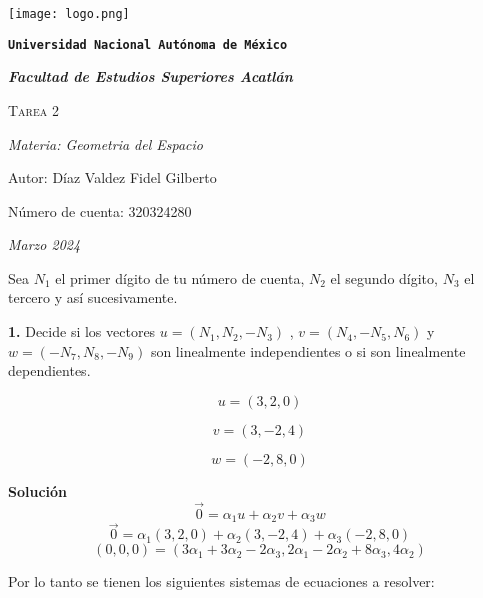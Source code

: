\documentclass{article}
\begin{document}
\begin{titlepage}
   \centering
   {\texttt{[image: logo.png]}\par}
   {\texttt{\bfseries \LARGE Universidad Nacional Autónoma de México} \par}
   \vspace{1cm}
   {\itshape \Large \bfseries Facultad de Estudios Superiores Acatlán \par}
   \vspace{3cm}
   {\scshape \Huge Tarea 2 \par}
   \vspace {3cm}
   {\slshape \Large Materia: Geometria del Espacio \par}
   \vspace{2cm}
   {\Large Autor: Díaz Valdez Fidel Gilberto\par}
   {\Large Número de cuenta: 320324280\par}
   \vfill
   {\itshape Marzo 2024 \par}
\end{titlepage}


Sea $N_1$ el primer dígito de tu número de cuenta, $N_2$ el segundo dígito, $N_3$ el tercero y así
sucesivamente.
\par
\textbf{1.} Decide si los vectores $u = (N_1,N_2,-N_3)$ , $v = (N_4,-N_5,N_6)$ y $w = (-N_7,N_8,-N_9)$ son linealmente
independientes o si son linealmente dependientes.


\begin{minipage}[c]{0.5cm}
   $$u = (3, 2, 0)$$
\end{minipage} \hspace*{3cm} %
\begin{minipage}[c]{0.5cm}
   $$v = (3, -2, 4)$$
\end{minipage} \hspace*{3cm}
\begin{minipage}[c]{0.5cm}
   $$w = (-2, 8, 0)$$
\end{minipage}
\vspace{10pt}


\textbf{Solución}
$$\vec{0} = \alpha_1u + \alpha_2v + \alpha_3w$$
$$\vec{0} = \alpha_1(3, 2, 0) + \alpha_2(3, -2, 4) + \alpha_3(-2, 8, 0)$$
$$(0, 0, 0) = (3\alpha_1 + 3\alpha_2 -2\alpha_3, 2\alpha_1 - 2\alpha_2+ 8\alpha_3, 4\alpha_2)$$


Por lo tanto se tienen los siguientes sistemas de ecuaciones a resolver:
\end{document}

